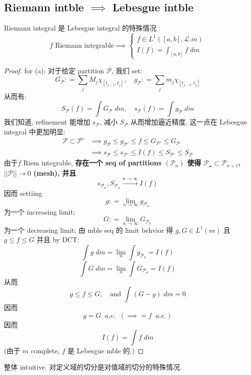 \documentclass[lang=cn,11pt]{elegantbook}
\begin{document}
\subsection{Riemann intble $\implies$ Lebesgue intble  }
\begin{theorem}{Riemann integral 是 Lebesgue integral 的特殊情况}
\[  f \text{ Riemann integrable} \implies\begin{cases}
        f \in L^1([a,b], \mathcal{L}. m) \\
        I(f) = \int_{[a,b]} f \; dm
    \end{cases} \]
\end{theorem}
\begin{proof}
    for (a): 对于给定 partition $\mathcal{P}$, 我们 set: \[
    G_\mathcal{P} : = \sum_j M_j  \chi_{[t_{j-1},t_j]} , \quad     g_\mathcal{P} : = \sum_j m_j  \chi_{[t_{j-1},t_j]} 
    \]
    从而有: \[
    S_\mathcal{P}(f) = \int G_\mathcal{P} \; dm , \quad s_\mathcal{P}(f) = \int g_\mathcal{P} \; dm
    \]
    我们知道, refinement 能增加 $s_\mathcal{P}$, 减小 $S_\mathcal{P}$ 从而增加逼近精度, 这一点在 Lebesgue integral 中更加明显: \begin{align}
 \mathcal{P } \subset \mathcal{P}' &\implies g_\mathcal{P} \leq g_\mathcal{P'} \leq f \leq G_{\mathcal{P}'} \leq  G_\mathcal{P}         \\
 & \implies s_\mathcal{P} \leq s_{\mathcal{P}'} \leq I(f) \leq S_\mathcal{P'} \leq S_\mathcal{P}
    \end{align}
由于$f$ Riem integrable, \textbf{存在一个 seq of partitions $(\mathcal{P}_n)$ 使得 $\mathcal{P_n}\subset \mathcal{P}_{n+1}$, $||\mathcal{P}|| \to 0$ (mesh), 并且} \[
s_{\mathcal{P_n}}, S_{\mathcal{P_n}} \overset{n \to \infty}{\longrightarrow}  I(f)
\]
因而 settiing \[
g : = \lim_{n\to \infty} g_{\mathcal{P}_n} 
\] 为一个 increasing limit; \[
G : = \lim_{n\to \infty} G_{\mathcal{P}_n} 
\] 为一个 decreasing limit; 由 mble seq 的 limit behvior 得 $g,G \in L^1(m)$ 且 $g \leq f \leq G$
并且 by DCT: \[
\int g \; dm = \lim_n \int g_{\mathcal{P}_n} = I(f) 
\]\[
\int G \; dm = \lim_n \int G_{\mathcal{P}_n} = I(f) 
\]
从而 \[
g \leq f \leq G , \quad \text{and }  \int (G-g) \; dm = 0
\]因而 \[ g =G \;\; a.e.  \;\;(\implies = f \;\; a.e.)
\]
因而 \[
I(f)  = \int f  \; dm
\]
(由于  $m$ complete, $f$ 是 Lebesgue mble 的.)
\end{proof}
\begin{remark}
    整体 intuitive. 对定义域的切分是对值域的切分的特殊情况. 
\end{remark}
\end{document}
